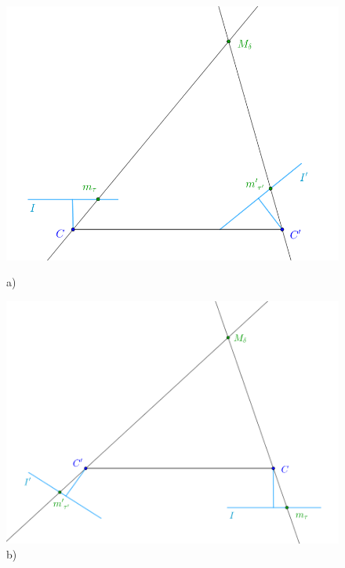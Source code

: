 \begin{figure}[!htb]
	\includegraphics[width=\linewidth]{images/P_Solution_one.png}
	\caption{a)}
	\label{fig:T_1}
	\endminipage\hfill
	\includegraphics[width=\linewidth]{images/P_Solution_two.png}
	\caption{b)}
	\label{fig:T_2}
	\endminipage\hfill
\end{figure}

